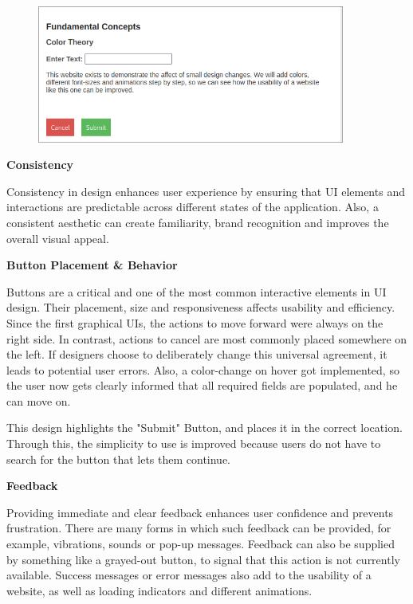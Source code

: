     \begin{figure} [H]
        \center
        \includegraphics [width=0.9\textwidth] {images/paul/usabilityExamples/ColorTheoryExample.png}
        \caption{}
    \end{figure}

\blankLine

\textbf{Consistency}

Consistency in design enhances user experience by ensuring that UI elements and interactions are predictable across different states of the application. Also, a consistent aesthetic can create familiarity, brand recognition and improves the overall visual appeal.

\blankLine

\textbf{Button Placement \& Behavior}

Buttons are a critical and one of the most common interactive elements in UI design. Their placement, size and responsiveness affects usability and efficiency. Since the first graphical UIs, the actions to move forward were always on the right side. In contrast, actions to cancel are most commonly placed somewhere on the left. If designers choose to deliberately change this universal agreement, it leads to potential user errors. Also, a color-change on hover got implemented, so the user now gets clearly informed that all required fields are populated, and he can move on. 

\blankLine

    This design highlights the "Submit" Button, and places it in the correct location. Through this, the simplicity to use is improved because users do not have to search for the button that lets them continue.

\blankLine

\textbf{Feedback}

Providing immediate and clear feedback enhances user confidence and prevents frustration. There are many forms in which such feedback can be provided, for example, vibrations, sounds or pop-up messages. Feedback can also be supplied by something like a grayed-out button, to signal that this action is not currently available. Success messages or error messages also add to the usability of a website, as well as loading indicators and different animations.


